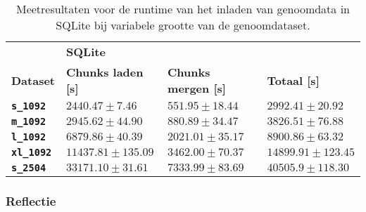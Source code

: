 \begin{table}[h]
\centering
\begin{tabular}{@{}llll@{}}
\cmidrule(l){2-4}
                              & \multicolumn{3}{|l|}{\textbf{SQLite}}                             \\ 
\cmidrule(l){1-4}
\multicolumn{1}{|l|}{\textbf{Dataset}}  & \multicolumn{1}{l|}{\textbf{Chunks laden [s]}} & \multicolumn{1}{l|}{\textbf{Chunks mergen [s]}} & \multicolumn{1}{l|}{\textbf{Totaal [s]}} \\ \midrule
\multicolumn{1}{|l|}{\textbf{\texttt{s\_1092}}} &    \multicolumn{1}{l|}{$2440.47 \pm 7.46$}         & \multicolumn{1}{l|}{$551.95 \pm 18.44$}          & \multicolumn{1}{l|}{$2992.41 \pm 20.92$}                          \\
\multicolumn{1}{|l|}{\textbf{\texttt{m\_1092}}} &    \multicolumn{1}{l|}{$2945.62 \pm 44.90$}       & \multicolumn{1}{l|}{$880.89 \pm 34.47$}          & \multicolumn{1}{l|}{$3826.51 \pm 76.88$}                          \\
\multicolumn{1}{|l|}{\textbf{\texttt{l\_1092}}} &    \multicolumn{1}{l|}{$6879.86 \pm 40.39$}       & \multicolumn{1}{l|}{$2021.01 \pm 35.17$}          & \multicolumn{1}{l|}{$8900.86 \pm 63.32$}                          \\
\multicolumn{1}{|l|}{\textbf{\texttt{xl\_1092}}} &    \multicolumn{1}{l|}{$11437.81 \pm 135.09$}       & \multicolumn{1}{l|}{$3462.00 \pm 70.37$}          & \multicolumn{1}{l|}{$14899.91 \pm 123.45$}                          \\
\multicolumn{1}{|l|}{\textbf{\texttt{s\_2504}}} &    \multicolumn{1}{l|}{$33171.10 \pm 31.61$}       & \multicolumn{1}{l|}{$7333.99 \pm 83.69$}          & \multicolumn{1}{l|}{$40505.9 \pm 118.30$}                          \\
\bottomrule
\end{tabular}
\caption{Meetresultaten voor de runtime van het inladen van genoomdata in SQLite bij variabele grootte van de genoomdataset.}
\end{table}

\newpage
\subsubsection{Reflectie}

